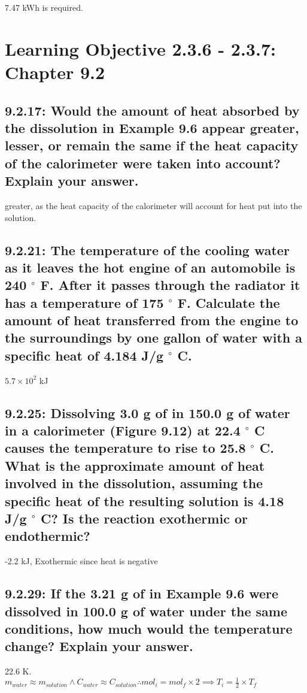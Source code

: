 \documentclass[11pt, letterpaper]{article}
\newcommand{\degree}{\ensuremath{{}^{\circ}}\xspace}
\begin{document}
7.47 kWh is required.


\section*{Learning Objective 2.3.6 - 2.3.7: Chapter 9.2}

\subsection*{9.2.17: Would the amount of heat absorbed by the dissolution 
in Example 9.6 appear greater, lesser, or remain the same if the heat 
capacity of the calorimeter were taken into account? Explain your answer.}

greater, as the heat capacity of the calorimeter will account for heat put into
the solution.

\subsection*{9.2.21: The temperature of the cooling water as it leaves the 
hot engine of an automobile is 240 \degree F. After it passes through the 
radiator it has a temperature of 175 \degree F. Calculate the amount of heat 
transferred from the engine to the surroundings by one gallon of water with 
a specific heat of 4.184 J/g \degree C.}

$5.7 \times 10^{2}$ kJ

\subsection*{9.2.25: Dissolving 3.0 g of  in 150.0 g of water 
in a calorimeter (Figure 9.12) at 22.4 \degree C causes the temperature to 
rise to 25.8 \degree C. What is the approximate amount of heat involved 
in the dissolution, assuming the specific heat of the resulting solution is 
4.18 J/g \degree C? Is the reaction exothermic or endothermic?}

-2.2 kJ, Exothermic since heat is negative

\subsection*{9.2.29: If the 3.21 g of  in Example 9.6 were 
dissolved in 100.0 g of water under the same conditions, how much would the 
temperature change? Explain your answer.}

22.6 K.\\ 
$m_{water} \approx m_{solution} \land C_{water} \approx C_{solution} \therefore mol_{i} = mol_{f} \times 2 \implies T_{i} = \frac{1}{2} \times T_{f}$
\end{document}
